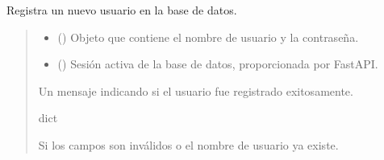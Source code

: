\documentclass[letterpaper,10pt,spanish]{sphinxmanual}
\begin{document}
\begin{fulllineitems}
\label{\detokenize{modelos:main.register}}
\pysigstartsignatures
\pysiglinewithargsret
{}
{\sphinxparamcomma {}}
{}
\pysigstopsignatures
\sphinxAtStartPar
Registra un nuevo usuario en la base de datos.
\begin{quote}\begin{description}
\begin{itemize}
\item {} 
\sphinxAtStartPar
{} ({\hyperref[\detokenize{modelos:main.UsuarioRegistro}]{}}) \textendash{} Objeto que contiene el nombre de usuario y la contraseña.

\item {} 
\sphinxAtStartPar
{} () \textendash{} Sesión activa de la base de datos, proporcionada por FastAPI.

\end{itemize}

\sphinxAtStartPar
Un mensaje indicando si el usuario fue registrado exitosamente.

\sphinxAtStartPar
dict

\sphinxAtStartPar
{} \textendash{} Si los campos son inválidos o el nombre de usuario ya existe.

\end{description}\end{quote}

\end{fulllineitems}

\end{document}

